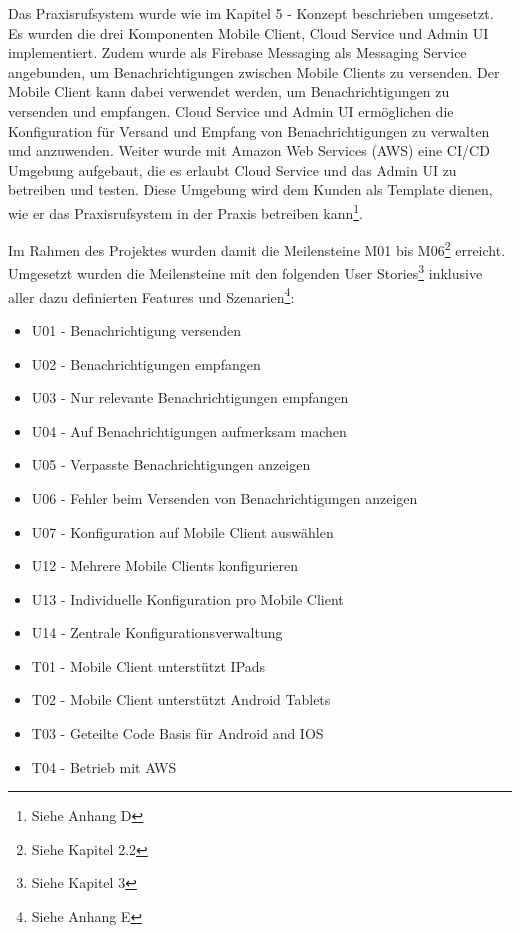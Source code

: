 Das Praxisrufsystem wurde wie im Kapitel 5 - Konzept beschrieben umgesetzt.
Es wurden die drei Komponenten Mobile Client, Cloud Service und Admin UI implementiert.
Zudem wurde als Firebase Messaging als Messaging Service angebunden, um Benachrichtigungen zwischen Mobile Clients zu versenden.
Der Mobile Client kann dabei verwendet werden, um Benachrichtigungen zu versenden und empfangen.
Cloud Service und Admin UI ermöglichen die Konfiguration für Versand und Empfang von Benachrichtigungen zu verwalten und anzuwenden.
Weiter wurde mit Amazon Web Services (AWS) eine CI/CD Umgebung aufgebaut, die es erlaubt Cloud Service und das Admin UI zu betreiben und testen.
Diese Umgebung wird dem Kunden als Template dienen, wie er das Praxisrufsystem in der Praxis betreiben kann\footnote{Siehe Anhang D}.

Im Rahmen des Projektes wurden damit die Meilensteine M01 bis M06\footnote{Siehe Kapitel 2.2} erreicht.
Umgesetzt wurden die Meilensteine mit den folgenden User Stories\footnote{Siehe Kapitel 3} inklusive aller dazu definierten Features und Szenarien\footnote{Siehe Anhang E}:

\begin{itemize}
    \item U01 - Benachrichtigung versenden
    \item U02 - Benachrichtigungen empfangen
    \item U03 - Nur relevante Benachrichtigungen empfangen
    \item U04 - Auf Benachrichtigungen aufmerksam machen
    \item U05 - Verpasste Benachrichtigungen anzeigen
    \item U06 - Fehler beim Versenden von Benachrichtigungen anzeigen
    \item U07 - Konfiguration auf Mobile Client auswählen
    \item U12 - Mehrere Mobile Clients konfigurieren
    \item U13 - Individuelle Konfiguration pro Mobile Client
    \item U14 - Zentrale Konfigurationsverwaltung
    \item T01 - Mobile Client unterstützt IPads
    \item T02 - Mobile Client unterstützt Android Tablets
    \item T03 - Geteilte Code Basis für Android and IOS
    \item T04 - Betrieb mit AWS
\end{itemize}


